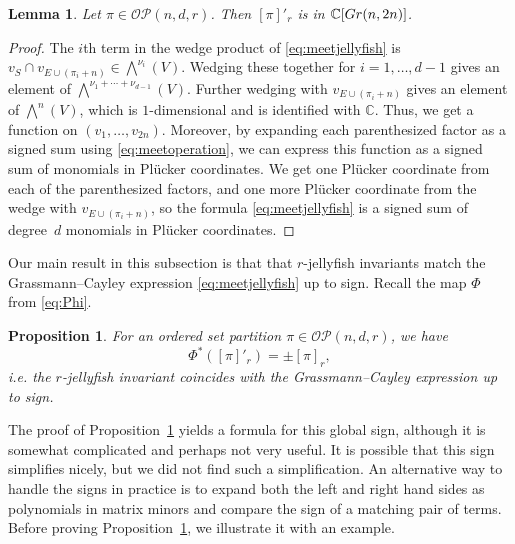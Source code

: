 \documentclass[10pt]{amsart}
\theoremstyle{definition}
\theoremstyle{plain}
\newtheorem{lemma}[cdrthm]{Lemma}
\theoremstyle{plain}
\newtheorem{proposition}[cdrthm]{Proposition}
\theoremstyle{definition}
\theoremstyle{remark}
\theoremstyle{plain}
\theoremstyle{plain}
\theoremstyle{plain}
\numberwithin{equation}{section}
\newcommand{\ordsetpart}{\mathcal{OP}}
\begin{document}
\begin{lemma}
   Let $\pi \in \ordsetpart(n,d,r)$. Then $[\pi]'_r$ is in $\mathbb{C}[{\rm Gr}(n,2n)]$.
\end{lemma}
\begin{proof}
The $i$th term in the wedge product of \eqref{eq:meetjellyfish} is $ v_{S} \cap v_{E \cup (\pi_i+n)} \in \bigwedge^{\nu_i}(V)$. Wedging these together for $i=1,\dots,d-1$ gives an element of $\bigwedge^{\nu_1+\cdots +\nu_{d-1}}(V)$. Further wedging with $v_{E \cup (\pi_i+n)}$ gives an element of 
$\bigwedge^{n}(V)$, which is $1$-dimensional and is identified with $\mathbb{C}$. Thus, we get a function on $(v_1,\dots,v_{2n})$. Moreover, by expanding each parenthesized factor as a signed sum using \eqref{eq:meetoperation}, we can express this function as a signed sum of monomials in Pl\"ucker coordinates. We get one Pl\"ucker coordinate from each of the parenthesized factors, and one more Pl\"ucker coordinate from the wedge with $v_{E \cup (\pi_i+n)}$, so the formula \eqref{eq:meetjellyfish} is a signed sum of degree~$d$ monomials in Pl\"ucker coordinates. 
\end{proof}

Our main result in this subsection is that that $r$-jellyfish invariants match the Grassmann--Cayley expression \eqref{eq:meetjellyfish} up to sign. Recall the map $\Phi$ from \eqref{eq:Phi}.
\begin{proposition}\label{prop:jellyfish_and_GC}
For an ordered set partition $\pi \in \ordsetpart(n,d,r)$, we have 
$$\Phi^*([\pi]'_r) = \pm [\pi]_r,$$
i.e. the $r$-jellyfish invariant coincides with the Grassmann--Cayley expression up to sign.
\end{proposition}

The proof of Proposition~\ref{prop:jellyfish_and_GC} yields a formula for this global sign, although it is somewhat complicated and perhaps not very useful. It is possible that this sign simplifies nicely, but we did not find such a simplification. An alternative way to handle the signs in practice is to expand both the left and right hand sides as polynomials in matrix minors and compare the sign of a matching pair of terms. Before proving Proposition~\ref{prop:jellyfish_and_GC}, we illustrate it with an example. 
\end{document}
